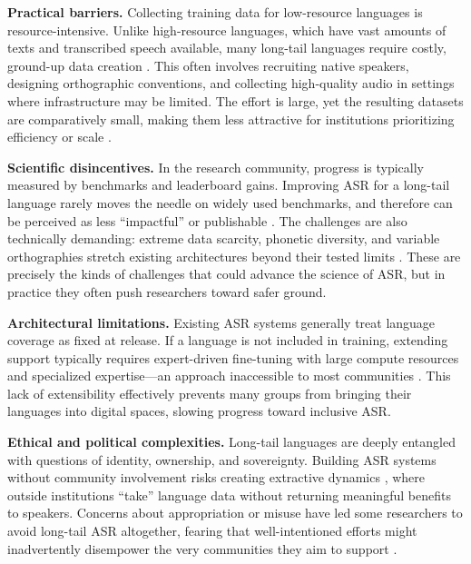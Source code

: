 \documentclass[]{fairmeta}
\begin{document}
\textbf{Practical barriers.} Collecting training data for low-resource languages is resource-intensive. Unlike high-resource languages, which have vast amounts of texts and transcribed speech available, many long-tail languages require costly, ground-up data creation \citep{abraham2020crowdsourcing,besacier2014automatic}. This often involves recruiting native speakers, designing orthographic conventions, and collecting high-quality audio in settings where infrastructure may be limited. The effort is large, yet the resulting datasets are comparatively small, making them less attractive for institutions prioritizing efficiency or scale \citep{blasi2021systematic}.

\textbf{Scientific disincentives.} In the research community, progress is typically measured by benchmarks and leaderboard gains. Improving ASR for a long-tail language rarely moves the needle on widely used benchmarks, and therefore can be perceived as less “impactful” or publishable \citep{mainzinger-levow-2024-fine}. The challenges are also technically demanding: extreme data scarcity, phonetic diversity, and variable orthographies stretch existing architectures beyond their tested limits \citep{adda2016breaking,joshi2020state}. These are precisely the kinds of challenges that could advance the science of ASR, but in practice they often push researchers toward safer ground.

\textbf{Architectural limitations.} Existing ASR systems generally treat language coverage as fixed at release. If a language is not included in training, extending support typically requires expert-driven fine-tuning with large compute resources and specialized expertise—an approach inaccessible to most communities \citep{imam2025automatic}. This lack of extensibility effectively prevents many groups from bringing their languages into digital spaces, slowing progress toward inclusive ASR.

\textbf{Ethical and political complexities.} Long-tail languages are deeply entangled with questions of identity, ownership, and sovereignty. Building ASR systems without community involvement risks creating extractive dynamics \citep{bird2024must}, where outside institutions “take” language data without returning meaningful benefits to speakers. Concerns about appropriation or misuse have led some researchers to avoid long-tail ASR altogether, fearing that well-intentioned efforts might inadvertently disempower the very communities they aim to support \citep{choi2025fairness,cooper2024s}.
\end{document}
